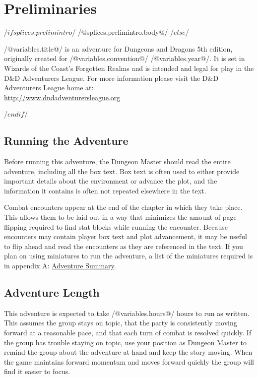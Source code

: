 \documentclass[10pt,twocolumn,twoside,openany]{book}
\begin{document}
\chapter*{Preliminaries}

/$ if splices.prelimintro $/
/@splices.prelimintro.body@/
/$ else $/

/@variables.title@/ is an adventure for Dungeons and Dragons 5th edition, originally created for
/@variables.convention@/ /@variables.year@/. It is set in Wizards of the Coast's Forgotten Realms
and is intended and legal for play in the D\&D Adventurers League. For more information please 
visit the D\&D Adventurers League home at:\\ \url{http://www.dndadventurersleague.org}

/$ endif $/

\section*{Running the Adventure}


Before running this adventure, the Dungeon Master should read the entire adventure, 
including all the box text. Box text is often used to either provide important details
about the environment or advance the plot, and the information it contains is often not
repeated elsewhere in the text.

Combat encounters appear at the end of the chapter in which they take place. This allows them to be
laid out in a way that minimizes the amount of page flipping required to find stat blocks while running
the encounter. Because encounters may contain player box text and plot advancement, it may be useful to
flip ahead and read the encounters as they are referenced in the text. If you plan on using miniatures to
run the adventure, a list of the miniatures required is in appendix
A: \hyperref[appendix_adventure_summary]{Adventure Summary}.

\section*{Adventure Length}
This adventure is expected to take /@variables.hours@/ hours to run as written. This assumes
the group stays on topic, that the party is consistently moving forward at a reasonable pace, 
and that each turn of combat is resolved quickly. If the group has trouble staying on topic,
use your position as Dungeon Master to remind the group about the adventure at hand and keep
the story moving. When the game maintains forward momentum and moves forward quickly the group
will find it easier to focus.
\end{document}
